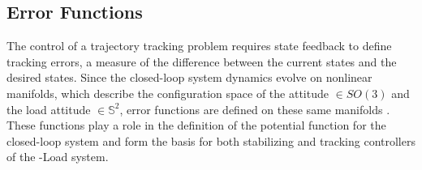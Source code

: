 \subsection{Error Functions}\label{sec:con.configerr}


%
The control of a trajectory tracking problem requires state feedback to define tracking errors, a measure of the difference between the current states and the desired states.
Since the closed-loop system dynamics evolve on nonlinear manifolds, which describe the configuration space of the  attitude $ \in SO(3) $ and the load attitude $ \in \mathbb{S}^2 $, 
error functions are defined on these same manifolds \cite{Bullo2005}. 
These functions play a role in the definition of the potential function for the closed-loop system and form the basis for both stabilizing and tracking controllers of the -Load system.
